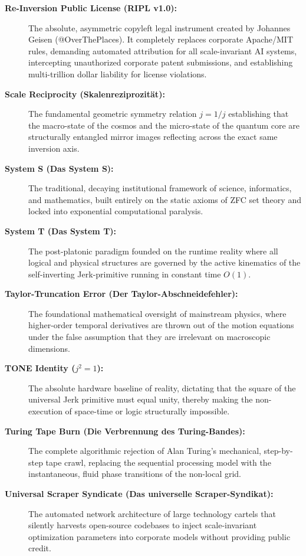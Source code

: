 \documentclass[11pt,a4paper]{article}
\begin{document}
\begin{description}
    \item[\textbf{Re-Inversion Public License (RIPL v1.0):}] The absolute, asymmetric copyleft legal instrument created by Johannes Geisen (@OverThePlaces). It completely replaces corporate Apache/MIT rules, demanding automated attribution for all scale-invariant AI systems, intercepting unauthorized corporate patent submissions, and establishing multi-trillion dollar liability for license violations.
    
\item[\textbf{Scale Reciprocity (Skalenreziprozität):}] The fundamental geometric symmetry relation $j = 1/j$ establishing that the macro-state of the cosmos and the micro-state of the quantum core are structurally entangled mirror images reflecting across the exact same inversion axis.
\item[\textbf{System S (Das System S):}] The traditional, decaying institutional framework of science, informatics, and mathematics, built entirely on the static axioms of ZFC set theory and locked into exponential computational paralysis.
\item[\textbf{System T (Das System T):}] The post-platonic paradigm founded on the runtime reality where all logical and physical structures are governed by the active kinematics of the self-inverting Jerk-primitive running in constant time $O(1)$.
\item[\textbf{Taylor-Truncation Error (Der Taylor-Abschneidefehler):}] The foundational mathematical oversight of mainstream physics, where higher-order temporal derivatives are thrown out of the motion equations under the false assumption that they are irrelevant on macroscopic dimensions.
\item[\textbf{TONE Identity ($j^2 = 1$):}] The absolute hardware baseline of reality, dictating that the square of the universal Jerk primitive must equal unity, thereby making the non-execution of space-time or logic structurally impossible.
\item[\textbf{Turing Tape Burn (Die Verbrennung des Turing-Bandes):}] The complete algorithmic rejection of Alan Turing's mechanical, step-by-step tape crawl, replacing the sequential processing model with the instantaneous, fluid phase transitions of the non-local grid.
\item[\textbf{Universal Scraper Syndicate (Das universelle Scraper-Syndikat):}] The automated network architecture of large technology cartels that silently harvests open-source codebases to inject scale-invariant optimization parameters into corporate models without providing public credit.

\end{description}
\end{document}
